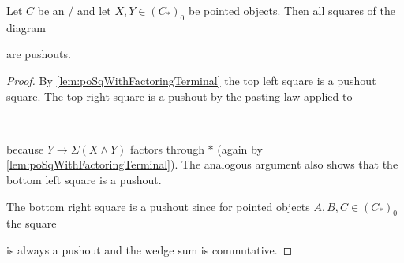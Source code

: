 \begin{lemma}\label{lem:allSqArePo} %
    Let $C$ be an \inftytop/ and let $X,Y\in \left(C_*\right)_0$ be pointed objects. 
    Then all squares of the diagram         
    \begin{center}
    \end{center}
    are pushouts.
    \begin{proof}
        By \cref{lem:poSqWithFactoringTerminal} the top left square is a pushout square.
        The top right square is a pushout by the pasting law applied to
        \begin{center}
            \
        \end{center}
        because $Y\to\Sigma\left(X\wedge Y\right)$ factors through $*$ (again by \cref{lem:poSqWithFactoringTerminal}).
        The analogous argument also shows that the bottom left square is a pushout.

        The bottom right square is a pushout since for pointed objects $A,B,C\in \left(C_*\right)_0$ the square
        \begin{center}
        \end{center}
        is always a pushout and the wedge sum is commutative. %
    \end{proof}
\end{lemma}
